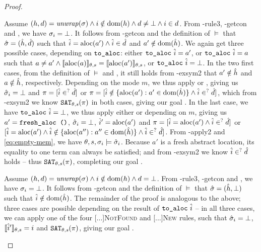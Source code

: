 \begin{proof}
\begin{hypvlist}
 Assume $(h,d)={\operatorname{\mathit{unwrap}}}(\sigma) \land i\notin\operatorname{dom}(h) \land d\neq\bot \land i\in d$.
 From \hyp{rule3}, \hyp{getcon} and , we have $\sigma_i=\bot$.
 It follows from \hyp{getcon} and the definition of $\models$ that $\hat{\sigma}=(\hat{h}, \hat{d})$ such that $\hat{i}=\text{aloc}(a') \land \hat{i} \in \hat{d}$ and $a'\notin \operatorname{dom}(\hat{h})$.
 We again get three possible cases, depending on $\texttt{to\_aloc}$: either $\texttt{to\_aloc}~\hat{i}=a'$, or $\texttt{to\_aloc}~\hat{i}=a$ such that $a\neq a'\land \llbracket\text{aloc}(a)\rrbracket_{\theta,s}=\llbracket\text{aloc}(a')\rrbracket_{\theta,s}$, or $\texttt{to\_aloc}~\hat{i}=\bot$.
 In the two first cases, from the definition of $\models$ and , it still holds from \hyp{exsym2} that $a'\notin \hat{h}$ and $a\notin \hat{h}$, respectively. Depending on the mode $m$, we thus apply  or , giving us $\hat{\sigma}_i=\bot$ and $\pi=[\hat{i}\in^? \hat{d}]$ or $\pi=[\hat{i} \notin \{\text{aloc}(a'):a'\in \operatorname{dom}(\hat{h})\} \land \hat{i}\in^? \hat{d}]$, which from \hyp{exsym2} we know $\texttt{SAT}_{\mathit{\theta,s}}(\pi)$ in both cases, giving our goal .
 In the last case, we have $\texttt{to\_aloc}~\hat{i}=\bot$, we thus apply either  or  depending on $m$, giving us $a'=\texttt{fresh\_aloc ()}$, $\hat{\sigma}_i=\bot$, $\hat{i}'=\text{aloc}(a')$ and $\pi=[\hat{i}=\text{aloc}(a') \land \hat{i}\in^? \hat{d}]$ or $[\hat{i}=\text{aloc}(a') \land \hat{i}\notin\{\text{aloc}(a''):a''\in \operatorname{dom}(\hat{h})\} \land \hat{i} \in^? \hat{d}]$. From \hyp{apply2} and \ref{eq:empty-mem}, we have $\theta,s,\sigma_i\models\hat{\sigma}_i$. Because $a'$ is a fresh abstract location, its equality to one term can always be satisfied; and from \hyp{exsym2} we know $\hat{i}\in^?\hat{d}$ holds -- thus $\texttt{SAT}_{\mathit{\theta,s}}(\pi)$, completing our goal .
\end{hypvlist}


\begin{hypvlist}
 Assume $(h,d)={\operatorname{\mathit{unwrap}}}(\sigma) \land i\notin\operatorname{dom}(h) \land d=\bot$.
 From \hyp{rule3}, \hyp{getcon} and , we have $\sigma_i=\bot$.
 It follows from \hyp{getcon} and the definition of $\models$ that $\hat{\sigma}=(\hat{h}, \bot)$ such that $\hat{i}\notin \operatorname{dom}(\hat{h})$.
 The remainder of the proof is analogous to the above; three cases are possible depending on the result of $\texttt{to\_aloc}~\hat{i}$ -- in all three cases, we can apply one of the four \textsc{[...]NotFound} and \textsc{[...]New} rules, such that $\hat{\sigma}_i=\bot$, $\llbracket\hat{i}'\rrbracket_{\theta,s}=i$ and $\texttt{SAT}_{\mathit{\theta,s}}(\pi)$, giving our goal .
\end{hypvlist}


\end{proof}
